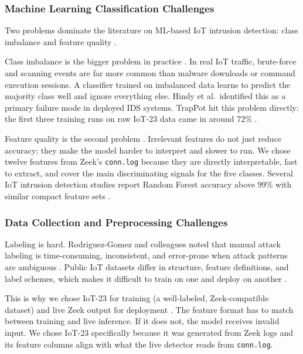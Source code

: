 \subsubsection{Machine Learning Classification Challenges}
\label{subsub:ml_challenges}

Two problems dominate the literature on ML-based IoT intrusion detection: class imbalance and feature quality \cite{hindy2023comprehensive,dekeersmaeker2023survey}.

Class imbalance is the bigger problem in practice \cite{hindy2023comprehensive}. In real IoT traffic, brute-force and scanning events are far more common than malware downloads or command execution sessions. A classifier trained on imbalanced data learns to predict the majority class well and ignore everything else. Hindy et al.\ identified this as a primary failure mode in deployed IDS systems. TrapPot hit this problem directly: the first three training runs on raw IoT-23 data came in around 72\% \cite{9213728,9912910,abdulsalam2023multiclass}.

Feature quality is the second problem \cite{dekeersmaeker2023survey}. Irrelevant features do not just reduce accuracy; they make the model harder to interpret and slower to run. We chose twelve features from Zeek's \texttt{conn.log} because they are directly interpretable, fast to extract, and cover the main discriminating signals for the five classes. Several IoT intrusion detection studies report Random Forest accuracy above 99\% with similar compact feature sets \cite{alzahrani2025lightweight}.

\subsubsection{Data Collection and Preprocessing Challenges}
\label{subsub:data_challenges}

Labeling is hard. Rodriguez-Gomez and colleagues noted that manual attack labeling is time-consuming, inconsistent, and error-prone when attack patterns are ambiguous \cite{rodriguezgomez2025systematic}. Public IoT datasets differ in structure, feature definitions, and label schemes, which makes it difficult to train on one and deploy on another \cite{dekeersmaeker2023survey}.

This is why we chose IoT-23 for training (a well-labeled, Zeek-compatible dataset) and live Zeek output for deployment \cite{iot23dataset,alex2023comprehensive}. The feature format has to match between training and live inference. If it does not, the model receives invalid input. We chose IoT-23 specifically because it was generated from Zeek logs and its feature columns align with what the live detector reads from \texttt{conn.log}.

